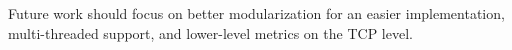 \documentclass[conference]{IEEEtran}
\begin{document}
Future work should focus on better modularization for an easier implementation, multi-threaded support, and lower-level metrics on the TCP level. 



%
%
%





\end{document}
